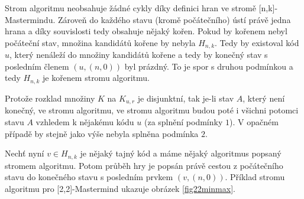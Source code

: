 



\begin{pozn}
    
    

    Strom algoritmu neobsahuje žádné cykly díky definici hran ve stromě [n,k]-Mastermindu. Zároveň do každého stavu (kromě počátečního) ústí právě jedna hrana a díky souvislosti tedy obsahuje nějaký kořen. Pokud by kořenem nebyl počáteční stav, množina kandidátů kořene by nebyla $H_{n,k}$. Tedy by existoval kód $u$, který nenáleží do množiny kandidátů kořene a tedy by konečný stav s posledním členem $(u, (n,0))$ byl prázdný. To je spor s druhou podmínkou a tedy $H_{n,k}$ je kořenem stromu algoritmu. 

    Protože rozklad množiny $K$ na $K_{u,r}$ je disjunktní, tak je-li stav $A$, který není konečný, ve stromu algoritmu, ve stromu algoritmu budou poté i všichni potomci stavu $A$ vzhledem k nějakému kódu $u$ (za splnění podmínky $1$). V opačném případě by stejně jako výše nebyla splněna podmínka $2$.
    
    Nechť nyní $v\in H_{n,k}$ je nějaký tajný kód a máme nějaký algoritmus popsaný stromem algoritmu. Potom průběh hry je popsán právě cestou z počátečního stavu do konečného stavu s posledním prvkem $(v,(n,0))$. Příklad stromu algoritmu pro [2,2]-Mastermind ukazuje obrázek \ref{fig22minmax}. 
    

    
\end{pozn}


